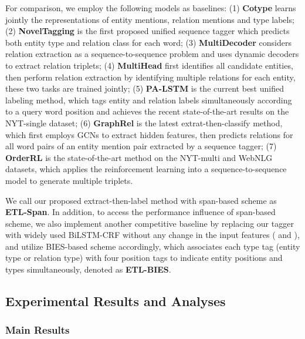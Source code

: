 \documentclass{ecai}
\begin{document}
For comparison, we employ the following models as baselines: 
(1) \textbf{Cotype} \cite{ren2017cotype} learns jointly the representations of entity mentions, relation mentions and type labels;
(2) \textbf{NovelTagging} \cite{zheng2017joint} is the first proposed unified sequence tagger which predicts both entity type and relation class for each word; 
(3) \textbf{MultiDecoder} \cite{zeng2018extracting} considers relation extraction as a sequence-to-sequence problem and uses dynamic decoders to extract relation triplets; 
(4) \textbf{MultiHead} \cite{bekoulis2018joint} first identifies all candidate entities, then perform relation extraction by identifying multiple relations for each entity, these two tasks are trained jointly;
(5) \textbf{PA-LSTM} \cite{dai2019joint} is the current best unified labeling method, which tags entity and relation labels simultaneously according to a query word position and achieves the recent state-of-the-art results on the NYT-single dataset; 
(6) \textbf{GraphRel} \cite{fu-etal-2019-graphrel} is the latest extrat-then-classify method, which first employs GCNs to extract hidden features, then predicts relations for all word pairs of an entity mention pair extracted by a sequence tagger;
(7) \textbf{OrderRL} \cite{zeng-etal-2019-learning} is the state-of-the-art method on the NYT-multi and WebNLG datasets, which applies the reinforcement learning into a sequence-to-sequence model to generate multiple triplets.


We call our proposed extract-then-label method with span-based scheme as \textbf{ETL-Span}. 
In addition, to access the performance influence of span-based scheme, we also implement another competitive baseline by replacing our tagger with widely used BiLSTM-CRF without any change in the input features ( and ), and utilize BIES-based scheme accordingly, which associates each type tag (entity type or relation type) with four position tags to indicate entity positions and types simultaneously, denoted as \textbf{ETL-BIES}. 


\subsection{Experimental Results and Analyses}

\subsubsection{Main Results}
\end{document}
